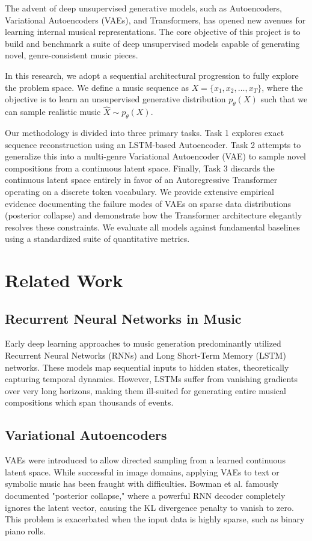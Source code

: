 \documentclass[conference]{IEEEtran}
\begin{document}
The advent of deep unsupervised generative models, such as Autoencoders, Variational Autoencoders (VAEs), and Transformers, has opened new avenues for learning internal musical representations. The core objective of this project is to build and benchmark a suite of deep unsupervised models capable of generating novel, genre-consistent music pieces.

In this research, we adopt a sequential architectural progression to fully explore the problem space. We define a music sequence as $X = \{x_1, x_2, \dots, x_T\}$, where the objective is to learn an unsupervised generative distribution $p_\theta(X)$ such that we can sample realistic music $\hat{X} \sim p_\theta(X)$. 

Our methodology is divided into three primary tasks. Task 1 explores exact sequence reconstruction using an LSTM-based Autoencoder. Task 2 attempts to generalize this into a multi-genre Variational Autoencoder (VAE) to sample novel compositions from a continuous latent space. Finally, Task 3 discards the continuous latent space entirely in favor of an Autoregressive Transformer operating on a discrete token vocabulary. We provide extensive empirical evidence documenting the failure modes of VAEs on sparse data distributions (posterior collapse) and demonstrate how the Transformer architecture elegantly resolves these constraints. We evaluate all models against fundamental baselines using a standardized suite of quantitative metrics.

\section{Related Work}
\subsection{Recurrent Neural Networks in Music}
Early deep learning approaches to music generation predominantly utilized Recurrent Neural Networks (RNNs) and Long Short-Term Memory (LSTM) networks. These models map sequential inputs to hidden states, theoretically capturing temporal dynamics. However, LSTMs suffer from vanishing gradients over very long horizons, making them ill-suited for generating entire musical compositions which span thousands of events. 

\subsection{Variational Autoencoders}
VAEs were introduced to allow directed sampling from a learned continuous latent space. While successful in image domains, applying VAEs to text or symbolic music has been fraught with difficulties. Bowman et al. famously documented "posterior collapse," where a powerful RNN decoder completely ignores the latent vector, causing the KL divergence penalty to vanish to zero. This problem is exacerbated when the input data is highly sparse, such as binary piano rolls.
\end{document}
